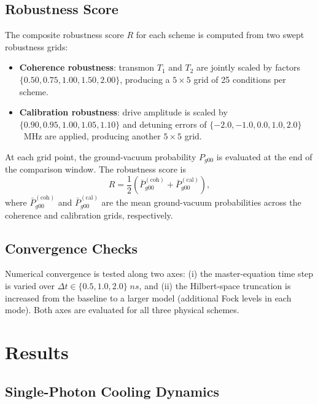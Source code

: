 \documentclass[aps,pra,twocolumn,reprint,floatfix,amsmath,amssymb]{revtex4-2}
\begin{document}
\subsection{Robustness Score}
\label{sec:robustness}

The composite robustness score $R$ for each scheme is computed from two swept robustness grids:
\begin{itemize}
\item \textbf{Coherence robustness}: transmon $T_1$ and $T_2$ are jointly scaled by factors $\{0.50, 0.75, 1.00, 1.50, 2.00\}$, producing a $5 \times 5$ grid of 25 conditions per scheme.
\item \textbf{Calibration robustness}: drive amplitude is scaled by $\{0.90, 0.95, 1.00, 1.05, 1.10\}$ and detuning errors of $\{-2.0, -1.0, 0.0, 1.0, 2.0\}$~MHz are applied, producing another $5 \times 5$ grid.
\end{itemize}
At each grid point, the ground-vacuum probability $P_{g00}$ is evaluated at the end of the comparison window.
The robustness score is
\begin{equation}
R = \frac{1}{2}\left(\bar{P}_{g00}^{(\mathrm{coh})} + \bar{P}_{g00}^{(\mathrm{cal})}\right),
\label{eq:robustness}
\end{equation}
where $\bar{P}_{g00}^{(\mathrm{coh})}$ and $\bar{P}_{g00}^{(\mathrm{cal})}$ are the mean ground-vacuum probabilities across the coherence and calibration grids, respectively.

\subsection{Convergence Checks}
\label{sec:convergence_method}

Numerical convergence is tested along two axes:
(i) the master-equation time step is varied over $\Delta t \in \{0.5, 1.0, 2.0\}\;\si{ns}$, and
(ii) the Hilbert-space truncation is increased from the baseline to a larger model (additional Fock levels in each mode).
Both axes are evaluated for all three physical schemes.

\section{Results}
\label{sec:results}

\subsection{Single-Photon Cooling Dynamics}
\end{document}
